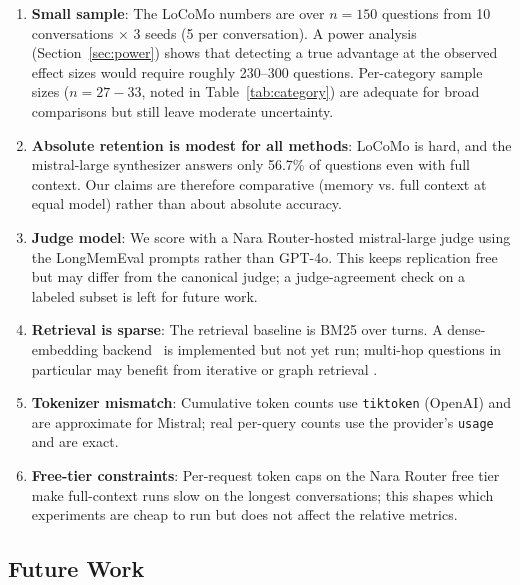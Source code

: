 \documentclass[conference]{IEEEtran}
\begin{document}
\begin{enumerate}
    \item \textbf{Small sample}: The LoCoMo numbers are over $n=150$ questions from 10 conversations $\times$ 3 seeds (5 per conversation). A power analysis (Section~\ref{sec:power}) shows that detecting a true advantage at the observed effect sizes would require roughly 230--300 questions. Per-category sample sizes ($n{=}27{-}33$, noted in Table~\ref{tab:category}) are adequate for broad comparisons but still leave moderate uncertainty.

    \item \textbf{Absolute retention is modest for all methods}: LoCoMo is hard, and the mistral-large synthesizer answers only 56.7\% of questions even with full context. Our claims are therefore comparative (memory vs. full context at equal model) rather than about absolute accuracy.

    \item \textbf{Judge model}: We score with a Nara Router-hosted mistral-large judge using the LongMemEval prompts rather than GPT-4o. This keeps replication free but may differ from the canonical judge; a judge-agreement check on a labeled subset is left for future work.

    \item \textbf{Retrieval is sparse}: The retrieval baseline is BM25 over turns. A dense-embedding backend~\cite{karpukhin2020dense} is implemented but not yet run; multi-hop questions in particular may benefit from iterative or graph retrieval \cite{xu2025amem}.

    \item \textbf{Tokenizer mismatch}: Cumulative token counts use \texttt{tiktoken} (OpenAI) and are approximate for Mistral; real per-query counts use the provider's \texttt{usage} and are exact.

    \item \textbf{Free-tier constraints}: Per-request token caps on the Nara Router free tier make full-context runs slow on the longest conversations; this shapes which experiments are cheap to run but does not affect the relative metrics.
\end{enumerate}

\subsection{Future Work}
\end{document}
